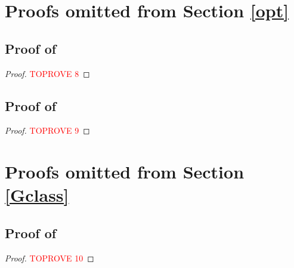 \documentclass[11pt, a4paper, twoside]{article}
\numberwithin{equation}{section}
\begin{document}
        \section{Proofs omitted from Section \ref{opt}}\label{suppopt}
        
        \subsection{Proof of }
        \begin{proof}\textcolor{red}{TOPROVE 8}\end{proof}
	
	\subsection{Proof of }
	\begin{proof}\textcolor{red}{TOPROVE 9}\end{proof}
 
	\section{Proofs omitted from Section \ref{Gclass}}\label{suppGclass}
	
	\subsection{Proof of }\label{suppGclassalgp}
	\begin{proof}\textcolor{red}{TOPROVE 10}\end{proof}
	
\end{document}
